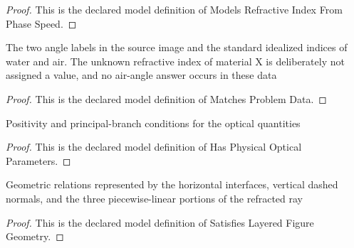 \begin{proof}
  This is the declared model definition of Models Refractive Index From Phase Speed.
\end{proof}
\begin{definition}
  \label{def:physics:phyx-mini-0091:phyxminiproblems-problemphyxmini0091-matchesproblemdata}
  The two angle labels in the source image and the standard idealized indices of water and air. The unknown refractive index of material X is deliberately not assigned a value, and no air-angle answer occurs in these data
\end{definition}
\begin{proof}
  This is the declared model definition of Matches Problem Data.
\end{proof}
\begin{definition}
  \label{def:physics:phyx-mini-0091:phyxminiproblems-problemphyxmini0091-hasphysicalopticalparameters}
  Positivity and principal-branch conditions for the optical quantities
\end{definition}
\begin{proof}
  This is the declared model definition of Has Physical Optical Parameters.
\end{proof}
\begin{definition}
  \label{def:physics:phyx-mini-0091:phyxminiproblems-problemphyxmini0091-satisfieslayeredfiguregeometry}
  Geometric relations represented by the horizontal interfaces, vertical dashed normals, and the three piecewise-linear portions of the refracted ray
\end{definition}
\begin{proof}
  This is the declared model definition of Satisfies Layered Figure Geometry.
\end{proof}

